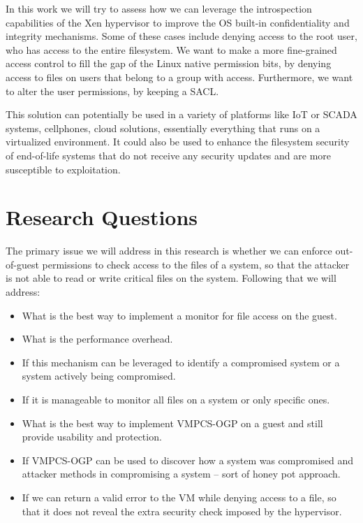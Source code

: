 \par In this work we will try to assess how we can leverage the introspection capabilities of the Xen hypervisor to improve the \ac{OS} built-in confidentiality and integrity mechanisms. Some of these cases include denying access to the root user, who has access to the entire filesystem. We want to make a more fine-grained access control to fill the gap of the Linux native permission bits, by denying access to files on users that belong to a group with access. Furthermore, we want to alter the user permissions, by keeping a \ac{SACL}. 

\par This solution can potentially be used in a variety of platforms like \ac{IoT} or \ac{SCADA} systems, cellphones, cloud solutions, essentially everything that runs on a virtualized environment. It could also be used to enhance the filesystem security of end-of-life systems that do not receive any security updates and are more susceptible to exploitation.

\section{Research Questions}\label{sec:question}
\par The primary issue we will address in this research is whether we can enforce out-of-guest permissions to check access to the files of a system, so that the attacker is not able to read or write critical files on the system. Following that we will address:
\begin{itemize}
	\item What is the best way to implement a monitor for file access on the guest.
	\item What is the performance overhead.
	\item If this mechanism can be leveraged to identify a compromised system or a system actively being compromised.
	\item If it is manageable to monitor all files on a system or only specific ones. 
	\item What is the best way to implement \ac{VMPCS-OGP} on a guest and still provide usability and protection.
	\item If \ac{VMPCS-OGP} can be used to discover how a system was compromised and attacker methods in compromising a system – sort of honey pot approach.
	\item If we can return a valid error to the VM while denying access to a file, so that it does not reveal the extra security check imposed by the hypervisor.
\end{itemize}

